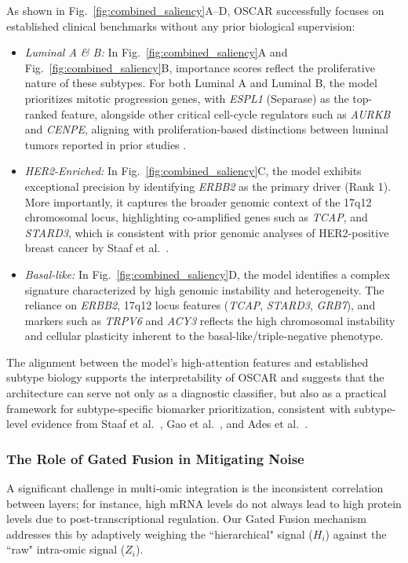 \documentclass[lettersize,journal]{IEEEtran}
\begin{document}
As shown in Fig.~\ref{fig:combined_saliency}A--D, OSCAR successfully focuses on established clinical benchmarks without any prior biological supervision:

\begin{itemize}
    \item \textit{Luminal A \& B:} In Fig.~\ref{fig:combined_saliency}A and Fig.~\ref{fig:combined_saliency}B, importance scores reflect the proliferative nature of these subtypes. For both Luminal A and Luminal B, the model prioritizes mitotic progression genes, with \textit{ESPL1} (Separase) as the top-ranked feature, alongside other critical cell-cycle regulators such as \textit{AURKB} and \textit{CENPE}, aligning with proliferation-based distinctions between luminal tumors reported in prior studies \cite{Gao2018LuminalA,Ades2014LuminalB}.

    \item \textit{HER2-Enriched:} In Fig.~\ref{fig:combined_saliency}C, the model exhibits exceptional precision by identifying \textit{ERBB2} as the primary driver (Rank 1). More importantly, it captures the broader genomic context of the 17q12 chromosomal locus, highlighting co-amplified genes such as \textit{TCAP}, and \textit{STARD3}, which is consistent with prior genomic analyses of HER2-positive breast cancer by Staaf et al.~\cite{Staaf2010HER2}.

    \item \textit{Basal-like:} In Fig.~\ref{fig:combined_saliency}D, the model identifies a complex signature characterized by high genomic instability and heterogeneity. The reliance on \textit{ERBB2}, 17q12 locus features (\textit{TCAP}, \textit{STARD3}, \textit{GRB7}), and markers such as \textit{TRPV6} and \textit{ACY3} reflects the high chromosomal instability and cellular plasticity inherent to the basal-like/triple-negative phenotype.
\end{itemize}

The alignment between the model's high-attention features and established subtype biology supports the interpretability of OSCAR and suggests that the architecture can serve not only as a diagnostic classifier, but also as a practical framework for subtype-specific biomarker prioritization, consistent with subtype-level evidence from Staaf et al.~\cite{Staaf2010HER2}, Gao et al.~\cite{Gao2018LuminalA}, and Ades et al.~\cite{Ades2014LuminalB}.

\subsubsection{The Role of Gated Fusion in Mitigating Noise}
A significant challenge in multi-omic integration is the inconsistent correlation between layers; for instance, high mRNA levels do not always lead to high protein levels due to post-transcriptional regulation. Our Gated Fusion mechanism addresses this by adaptively weighing the ``hierarchical" signal ($H_i$) against the ``raw" intra-omic signal ($Z_i$). 
\end{document}
